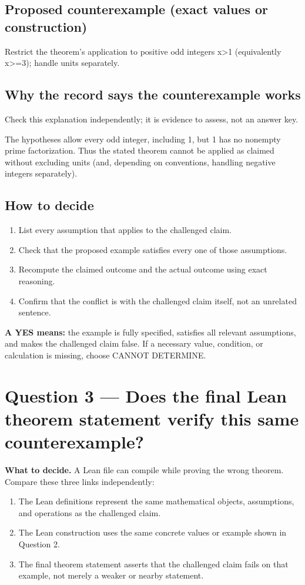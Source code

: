 \documentclass[11pt]{article}
\begin{document}
\subsection*{Proposed counterexample (exact values or construction)}
\begin{Vsrc}
Restrict the theorem’s application to positive odd integers x>1 (equivalently x>=3); handle units separately.
\end{Vsrc}
\subsection*{Why the record says the counterexample works}
Check this explanation independently; it is evidence to assess, not an answer key.
\begin{Vsrc}
The hypotheses allow every odd integer, including 1, but 1 has no nonempty prime factorization. Thus the stated theorem cannot be applied as claimed without excluding units (and, depending on conventions, handling negative integers separately).
\end{Vsrc}
\subsection*{How to decide}
\begin{enumerate}
\item List every assumption that applies to the challenged claim.
\item Check that the proposed example satisfies every one of those assumptions.
\item Recompute the claimed outcome and the actual outcome using exact reasoning.
\item Confirm that the conflict is with the challenged claim itself, not an unrelated sentence.
\end{enumerate}
\textbf{A YES means:} the example is fully specified, satisfies all relevant assumptions, and makes the challenged claim false. If a necessary value, condition, or calculation is missing, choose CANNOT DETERMINE.
\section*{Question 3 --- Does the final Lean theorem statement verify this same counterexample?}
\textbf{What to decide.} A Lean file can compile while proving the wrong theorem. Compare these three links independently:
\begin{enumerate}
\item The Lean definitions represent the same mathematical objects, assumptions, and operations as the challenged claim.
\item The Lean construction uses the same concrete values or example shown in Question 2.
\item The final theorem statement asserts that the challenged claim fails on that example, not merely a weaker or nearby statement.
\end{enumerate}
\end{document}
